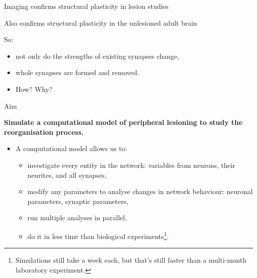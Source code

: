 \begin{frame}[c]{Imaging confirms structural plasticity in lesion studies}
    \begin{itemize}
      \item {}
        \pause{}
        \footnotesize{
      \item {}
      \item {}
      \item {}
      \item {}
      }
    \end{itemize}
\end{frame}
\begin{frame}[c]{Also confirms structural plasticity in the unlesioned adult brain}
    \begin{itemize}
      \item {}
        \pause{}
        \footnotesize{
      \item {}
      \item {}
      \item {}
      \item {}
      }
    \end{itemize}
\end{frame}
\begin{frame}[c]{So:}
  \begin{itemize}
    \item not only do the strengths of existing synapses change,
    \item \alert{whole synapses are formed and removed.}
      \pause{}
    \item How? Why?
  \end{itemize}
\end{frame}
\begin{frame}[c]{Aim}
  \begin{center}
    \textbf{Simulate a computational model of peripheral lesioning to study the reorganisation process.}
  \end{center}
  \pause{}
  \begin{itemize}
    \item A computational model allows us to:
      \begin{itemize}
        \item investigate every entity in the network: variables from neurons, their neurites, and all synapses,
        \item modify any parameters to analyse changes in network behaviour: neuronal parameters, synaptic parameters,
        \item run multiple analyses in parallel,
        \item do it in less time than biological experiments\footnote[1]<2->{Simulations still take a week each, but that's still faster than a multi-month laboratory experiment.}.
      \end{itemize}
  \end{itemize}
\end{frame}
